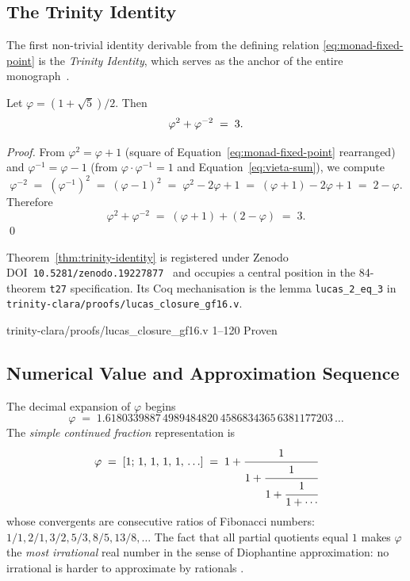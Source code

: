 \subsection{The Trinity Identity}

The first non-trivial identity derivable from the defining relation
\eqref{eq:monad-fixed-point} is the \emph{Trinity Identity}, which
serves as the anchor of the entire monograph~\cite{vasilev2026zenodo}.

\begin{theorem}\label{thm:trinity-identity}
  Let $\varphi = (1+\sqrt{5})/2$.  Then
  \begin{equation}\label{eq:trinity}
    \varphi^{2} + \varphi^{-2} \;=\; 3.
  \end{equation}
\end{theorem}

\begin{proof}
  From $\varphi^{2} = \varphi + 1$ (square of Equation~\eqref{eq:monad-fixed-point}
  rearranged) and $\varphi^{-1} = \varphi - 1$ (from $\varphi\cdot\varphi^{-1}=1$
  and Equation~\eqref{eq:vieta-sum}), we compute
  \[
    \varphi^{-2} \;=\; (\varphi^{-1})^{2} \;=\; (\varphi-1)^{2}
    \;=\; \varphi^{2} - 2\varphi + 1
    \;=\; (\varphi+1) - 2\varphi + 1
    \;=\; 2 - \varphi.
  \]
  Therefore
  \[
    \varphi^{2} + \varphi^{-2}
    \;=\; (\varphi+1) + (2-\varphi)
    \;=\; 3.
  \]
  \qed
\end{proof}

\begin{remark}
  Theorem~\ref{thm:trinity-identity} is registered under Zenodo
  DOI~\texttt{10.5281/zenodo.19227877}~\cite{vasilev2026zenodo} and
  occupies a central position in the 84-theorem \texttt{t27}
  specification.  Its Coq mechanisation is the lemma
  \texttt{lucas\_2\_eq\_3} in
  \texttt{trinity-clara/proofs/lucas\_closure\_gf16.v}.
\end{remark}

%
        {trinity-clara/proofs/lucas\_closure\_gf16.v}%
        {1--120}%
        {Proven}

\subsection{Numerical Value and Approximation Sequence}

The decimal expansion of $\varphi$ begins
\[
  \varphi \;=\; 1.6180339887\,4989484820\,4586834365\,6381177203\,\ldots
\]
The \emph{simple continued fraction} representation is
\[
  \varphi \;=\; [1;\,1,\,1,\,1,\,1,\,\ldots] \;=\; 1 + \cfrac{1}{1+\cfrac{1}{1+\cfrac{1}{1+\cdots}}}
\]
whose convergents are consecutive ratios of Fibonacci numbers:
$1/1, 2/1, 3/2, 5/3, 8/5, 13/8, \ldots$
The fact that all partial quotients equal $1$ makes $\varphi$ the
\emph{most irrational} real number in the sense of Diophantine
approximation: no irrational is harder to approximate by rationals
\cite{hardywright}.

